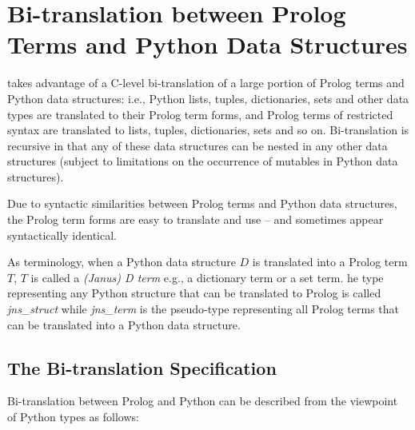 
\section{Bi-translation between Prolog Terms and Python Data Structures} \label{sec:jns-bi-translation}

\janus{} takes advantage of a C-level bi-translation of a large
portion of Prolog terms and Python data structures: i.e., Python
lists, tuples, dictionaries, sets and other data types are translated
to their Prolog term forms, and Prolog terms of restricted syntax are
translated to lists, tuples, dictionaries, sets and so on.
Bi-translation is recursive in that any of these data structures can
be nested in any other data structures (subject to limitations on
the occurrence of mutables in Python data structures).
     
Due to syntactic similarities between Prolog terms and Python data
structures, the Prolog term forms are easy to translate and use -- and
sometimes appear syntactically identical.

%
As terminology, when a Python data structure $D$ is translated into a
Prolog term $T$, $T$ is called a {\em (Janus) D term} e.g., a
dictionary term or a set term.  he type representing any Python
structure that can be translated to Prolog is called {\em jns\_struct}
while {\em jns\_term} is the pseudo-type representing all Prolog terms
that can be translated into a Python data structure.

\subsection{The Bi-translation Specification} \label{sec-bi-translation}

Bi-translation between Prolog and Python can be described from the
viewpoint of Python types as follows:

